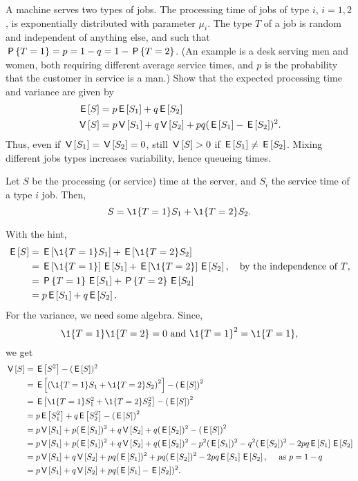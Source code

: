 \begin{exercise}\label{ex:49}
  A machine serves two types of jobs.
  The processing time of jobs of type $i$, $i=1,2$, is exponentially distributed with parameter $\mu_i$.
  The type $T$ of a job is random and independent of anything else, and such that $\P{T=1} = p = 1-q = 1-\P{T=2}$.
  (An example is a desk serving men and women, both requiring different average service times, and $p$ is the probability that the customer in service is a man.)
  Show that the expected processing time and variance are given by
\begin{align*}
 \E S &= p \E{S_1} + q \E{S_2} \\
\V S &= p \V{S_1} + q \V{S_2} + pq(\E{S_1} - \E{S_2})^2.
 \end{align*}
Thus, even if $\V{S_1} = \V{S_2} = 0$, still $\V S > 0$ if $\E{S_1} \neq \E{S_2}$.
    Mixing different jobs types increases variability, hence queueing times.
\begin{hint}
 Let $S$ be the processing (or service) time at the server, and
 $S_i$ the service time of a type $i$ job. Then,
 \begin{equation*}
 S = \1{T=1} S_1 + \1{T=2} S_2.
 \end{equation*}
\end{hint}
\begin{solution}
With the hint,
\begin{align*}
 \E S
&= \E{\1{T=1} S_1} + \E{\1{T=2} S_2} \\
&= \E{\1{T=1}} \E{S_1} + \E{\1{T=2}} \E{S_2}, \quad \text{by the independence of $T$}, \\
&= \P{T=1}\E{S_1} + \P{T=2} \E{S_2} \\
&= p \E{S_1} + q \E{S_2}.
\end{align*}
For the variance, we need some algebra. Since,
\begin{equation*}
\1{T=1}\1{T=2} = 0 \text{ and } \1{T=1}^2 = \1{T=1},
\end{equation*}
we get
\begin{align*}
 \V S
&= \E{S^2} - (\E S)^2 \\
&= \E{\left(\1{T=1} S_1 + \1{T=2} S_2\right)^2} - \left(\E{S}\right)^2 \\
&= \E{\1{T=1} S_1^2 + \1{T=2} S_2^2} - \left(\E S \right)^2 \\
&= p \E{S_1^2} + q \E{S_2^2} - \left(\E S \right)^2 \\
&= p \V{S_1} + p (\E{S_1})^2 + q \V{S_2} + q(\E{S_2})^2 - \left(\E S\right)^2 \\
&= p \V{S_1} + p (\E{S_1})^2 + q \V{S_2} + q(\E{S_2})^2 - p^2 (\E{S_1})^2 - q^2 (\E{S_2})^2 - 2pq \E{S_1}\E{S_2} \\
&= p \V{S_1} + q \V{S_2} + pq (\E{S_1})^2 +pq (\E{S_2})^2 - 2pq \E{S_1}\E{S_2}, \quad\text{ as } p = 1-q\\
&= p \V{S_1} + q \V{S_2} + pq(\E{S_1} - \E{S_2})^2.
\end{align*}
\end{solution}
\end{exercise}





